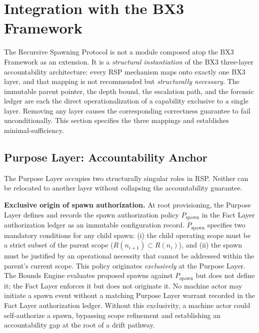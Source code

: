 \section{Integration with the BX3 Framework}
\label{sec:rs-integration}

The Recursive Spawning Protocol is not a module composed atop the BX3 Framework as an extension. It is a \emph{structural instantiation} of the BX3 three-layer accountability architecture: every RSP mechanism maps onto exactly one BX3 layer, and that mapping is not recommended but \emph{structurally necessary}. The immutable parent pointer, the depth bound, the escalation path, and the forensic ledger are each the direct operationalization of a capability exclusive to a single layer. Removing any layer causes the corresponding correctness guarantee to fail unconditionally. This section specifies the three mappings and establishes minimal-sufficiency.

\subsection{Purpose Layer: Accountability Anchor}
\label{sec:rs-purpose-anchor}

The Purpose Layer occupies two structurally singular roles in RSP. Neither can be relocated to another layer without collapsing the accountability guarantee.

\medskip
\noindent\textbf{Exclusive origin of spawn authorization.} At root provisioning, the Purpose Layer defines and records the spawn authorization policy $P_{\mathrm{spawn}}$ in the Fact Layer authorization ledger as an immutable configuration record. $P_{\mathrm{spawn}}$ specifies two mandatory conditions for any child spawn: (i) the child operating scope must be a strict subset of the parent scope ($R(n_{i+1}) \subset R(n_i)$), and (ii) the spawn must be justified by an operational necessity that cannot be addressed within the parent's current scope. This policy originates \emph{exclusively} at the Purpose Layer. The Bounds Engine evaluates proposed spawns against $P_{\mathrm{spawn}}$ but does not define it; the Fact Layer enforces it but does not originate it. No machine actor may initiate a spawn event without a matching Purpose Layer warrant recorded in the Fact Layer authorization ledger. Without this exclusivity, a machine actor could self-authorize a spawn, bypassing scope refinement and establishing an accountability gap at the root of a drift pathway.

